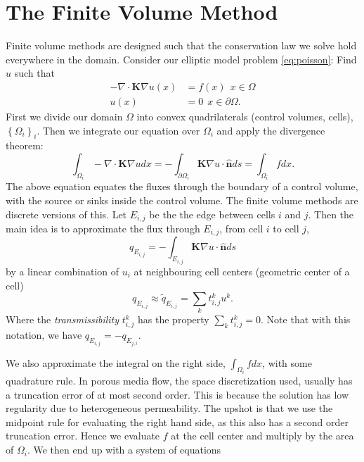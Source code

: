 \documentclass[../Main/main.tex]{subfiles}
\begin{document}
	\section{The Finite Volume Method}


		Finite volume methods are designed such that the conservation law we solve hold everywhere in the domain. Consider our elliptic model problem \eqref{eq:poisson}:
		Find $u$ such that
		\begin{equation} 
			\begin{split}
				-\nabla \cdot \bm{K} \nabla u(x) &= f(x) \ \  x\in \Omega \\ 
				u(x) &= 0 \ \ x\in \partial \Omega.
			\end{split}
		\end{equation}
		 First we divide our domain $\Omega$ into convex quadrilaterals (control volumes, cells), $\left \{ \Omega_i \right \}_i$. Then we integrate our equation over $\Omega_i$ and apply the divergence theorem:
	\begin{equation}\label{eq:fvm1}
		\int_{\Omega_i} -\nabla \cdot \bm{K} \nabla u dx = -\int_{\partial \Omega_i} \bm{K}\nabla u \cdot \bm{\hat{n}} ds = \int_{\Omega_i}fdx.
	\end{equation}
	The above equation equates the fluxes through the boundary of a control volume, with the source or sinks inside the control volume. The finite volume methods are discrete versions of this. Let $E_{i,j}$ be the the edge between cells $i$ and $j$. Then the main idea is to approximate the flux through $E_{i,j}$, from cell $i$ to cell $j$,
	\begin{equation}
		q_{E_{i,j}} =-\int_{E_{i,j}} \bm{K}\nabla u \cdot \bm{\hat{n}} ds
	\end{equation}
	by a linear combination of $u_i$ at neighbouring cell centers (geometric center of a cell)
	\begin{equation}
		q_{E_{i,j}}\approx \tilde{q}_{E_{i,j}} = \sum_{k}t_{i,j}^k u^k.
	\end{equation}
	Where the \emph{transmissibility} $t_{i,j}^k$ has the property $\sum_k t_{i,j}^k = 0$. Note that with this notation, we have $q_{E_{i,j}} = - q_{E_{j,i}}$.\par
	We also approximate the integral on the right side, $\int_{\Omega_i}fdx$, with some quadrature rule. In porous media flow, the space discretization used, usually has a truncation error of at most second order. This is because the solution has low regularity due to heterogeneous permeability. The upshot is that we use the midpoint rule for evaluating the right hand side, as this also has a second order truncation error. Hence we evaluate $f$ at the cell center and multiply by the area of $\Omega_i$. We then end up with a system of equations
\end{document}

